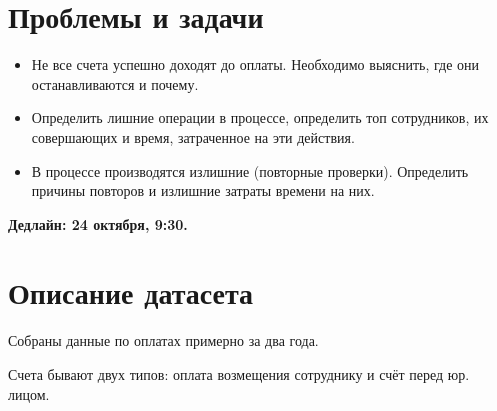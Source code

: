\documentclass[12pt]{article}
\begin{document}
\tableofcontents
\newpage

\section{Проблемы и задачи}
\begin{itemize}
    \item Не все счета успешно доходят до оплаты. Необходимо выяснить, где они останавливаются и почему.

    \item Определить лишние операции в процессе, определить топ сотрудников, их совершающих и время, затраченное на эти действия.

    \item В процессе производятся излишние (повторные проверки). Определить причины повторов и излишние затраты времени на них.
\end{itemize}
\textbf{Дедлайн: 24 октября, 9:30.}
\newpage

\section{Описание датасета}
Собраны данные по оплатах примерно за два года.

Счета бывают двух типов: оплата возмещения сотруднику и счёт перед юр. лицом.
\end{document}
